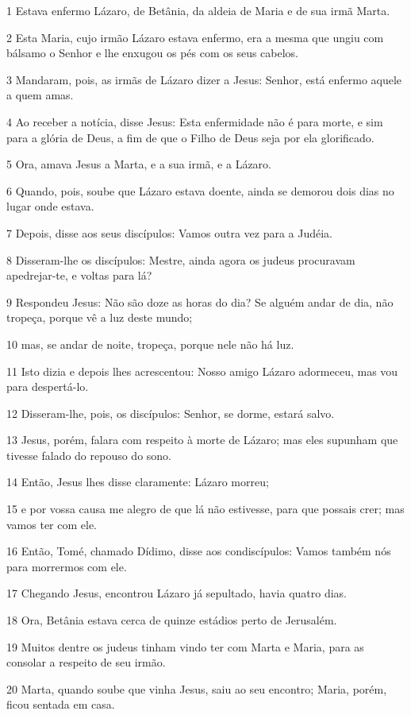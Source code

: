 \par 1 Estava enfermo Lázaro, de Betânia, da aldeia de Maria e de sua irmã Marta.
\par 2 Esta Maria, cujo irmão Lázaro estava enfermo, era a mesma que ungiu com bálsamo o Senhor e lhe enxugou os pés com os seus cabelos.
\par 3 Mandaram, pois, as irmãs de Lázaro dizer a Jesus: Senhor, está enfermo aquele a quem amas.
\par 4 Ao receber a notícia, disse Jesus: Esta enfermidade não é para morte, e sim para a glória de Deus, a fim de que o Filho de Deus seja por ela glorificado.
\par 5 Ora, amava Jesus a Marta, e a sua irmã, e a Lázaro.
\par 6 Quando, pois, soube que Lázaro estava doente, ainda se demorou dois dias no lugar onde estava.
\par 7 Depois, disse aos seus discípulos: Vamos outra vez para a Judéia.
\par 8 Disseram-lhe os discípulos: Mestre, ainda agora os judeus procuravam apedrejar-te, e voltas para lá?
\par 9 Respondeu Jesus: Não são doze as horas do dia? Se alguém andar de dia, não tropeça, porque vê a luz deste mundo;
\par 10 mas, se andar de noite, tropeça, porque nele não há luz.
\par 11 Isto dizia e depois lhes acrescentou: Nosso amigo Lázaro adormeceu, mas vou para despertá-lo.
\par 12 Disseram-lhe, pois, os discípulos: Senhor, se dorme, estará salvo.
\par 13 Jesus, porém, falara com respeito à morte de Lázaro; mas eles supunham que tivesse falado do repouso do sono.
\par 14 Então, Jesus lhes disse claramente: Lázaro morreu;
\par 15 e por vossa causa me alegro de que lá não estivesse, para que possais crer; mas vamos ter com ele.
\par 16 Então, Tomé, chamado Dídimo, disse aos condiscípulos: Vamos também nós para morrermos com ele.
\par 17 Chegando Jesus, encontrou Lázaro já sepultado, havia quatro dias.
\par 18 Ora, Betânia estava cerca de quinze estádios perto de Jerusalém.
\par 19 Muitos dentre os judeus tinham vindo ter com Marta e Maria, para as consolar a respeito de seu irmão.
\par 20 Marta, quando soube que vinha Jesus, saiu ao seu encontro; Maria, porém, ficou sentada em casa.
